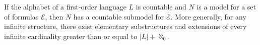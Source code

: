 If the alphabet of a first-order language $L$ is countable and $N$ is a model for a set of formulas $\mathcal{E}$, then $N$ has a countable submodel for $\mathcal{E}$. More generally, for any infinite structure, there exist elementary substructures and extensions of every infinite cardinality greater than or equal to $|L| + \aleph_0$.
